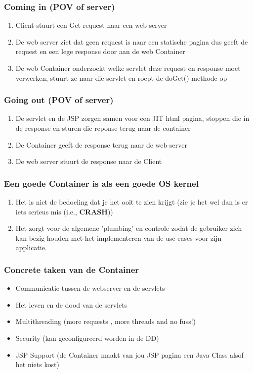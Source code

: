 \documentclass{beamer}
\begin{document}
\begin{frame}

\frametitle{Coming in (POV of server)}
{\Large 
\begin{enumerate}
  \item Client stuurt een Get request naar een web server
  \item De web server ziet dat geen request is naar een statische pagina dus geeft de request en een lege response door aan de web Container
  \item De web Container onderzoekt welke servlet deze request en response moet verwerken, stuurt ze naar die servlet en roept de doGet() methode op
\end{enumerate}
}
\end{frame}


\begin{frame}

\frametitle{Going out (POV of server)}
{\Large 
\begin{enumerate}
  \item De servlet en de JSP zorgen samen voor een JIT html pagina, stoppen die in de response en sturen die reponse terug naar de container
  \item De Container geeft de response terug naar de web server
  \item De web server stuurt de response naar de Client
\end{enumerate}
}
\end{frame}


\begin{frame}

\frametitle{Een goede Container is als een goede OS kernel}

{\Large 

\begin{enumerate}
  \item Het is niet de bedoeling dat je het ooit te zien krijgt (zie je het wel dan is er iets serieus mis (i.e., \textbf{CRASH}))
  \item Het zorgt voor de algemene 'plumbing' en controle zodat de gebruiker zich kan bezig houden met het implementeren van de use cases voor zijn applicatie.
\end{enumerate}

}

\end{frame}


\begin{frame}

\frametitle{Concrete taken van de Container}
{\Large 
\begin{itemize}
  \item Communicatie tussen de webserver en de servlets
  \item Het leven en de dood van de servlets
  \item Multithreading (more requests , more threads and no fuss!)
  \item Security (kan geconfigureerd worden in de DD)
  \item JSP Support (de Container maakt van jou JSP pagina een Java Class alsof het niets kost)
\end{itemize}
}
\end{frame}
\end{document}
